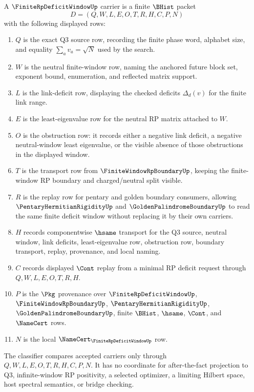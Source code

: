 \begin{definition}
\label{def:finite-rp-deficit-window-carrier}
A $\FiniteRpDeficitWindowUp$ carrier is a finite $\BHist$ packet
$$
D=(Q,W,L,E,O,T,R,H,C,P,N)
$$
with the following displayed rows:
\begin{enumerate}
\item $Q$ is the exact Q3 source row, recording the finite phase word, alphabet size, and equality $\sum_a v_a=\sqrt N$ used by the search.
\item $W$ is the neutral finite-window row, naming the anchored future block set, exponent bound, enumeration, and reflected matrix support.
\item $L$ is the link-deficit row, displaying the checked deficits $\Delta_d(v)$ for the finite link range.
\item $E$ is the least-eigenvalue row for the neutral RP matrix attached to $W$.
\item $O$ is the obstruction row: it records either a negative link deficit, a negative neutral-window least eigenvalue, or the visible absence of those obstructions in the displayed window.
\item $T$ is the transport row from $\FiniteWindowRpBoundaryUp$, keeping the finite-window RP boundary and charged/neutral split visible.
\item $R$ is the replay row for pentary and golden boundary consumers, allowing $\PentaryHermitianRigidityUp$ and $\GoldenPalindromeBoundaryUp$ to read the same finite deficit window without replacing it by their own carriers.
\item $H$ records componentwise $\hsame$ transport for the Q3 source, neutral window, link deficits, least-eigenvalue row, obstruction row, boundary transport, replay, provenance, and local naming.
\item $C$ records displayed $\Cont$ replay from a minimal RP deficit request through $Q,W,L,E,O,T,R,H$.
\item $P$ is the $\Pkg$ provenance over $\FiniteRpDeficitWindowUp$, $\FiniteWindowRpBoundaryUp$, $\PentaryHermitianRigidityUp$, $\GoldenPalindromeBoundaryUp$, finite $\BHist$, $\hsame$, $\Cont$, and $\NameCert$ rows.
\item $N$ is the local $\NameCert_{\FiniteRpDeficitWindowUp}$ row.
\end{enumerate}
The classifier compares accepted carriers only through $Q,W,L,E,O,T,R,H,C,P,N$. It has no coordinate for after-the-fact projection to Q3, infinite-window RP positivity, a selected optimizer, a limiting Hilbert space, host spectral semantics, or bridge checking.
\end{definition}

